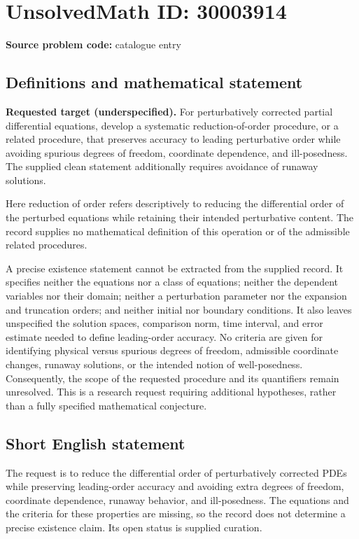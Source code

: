 \documentclass[11pt]{article}
\begin{document}
\section*{UnsolvedMath ID: 30003914}
\textbf{Source problem code:} catalogue entry
\subsection{Definitions and mathematical statement}
\textbf{Requested target (underspecified).} For perturbatively corrected partial differential equations, develop a systematic reduction-of-order procedure, or a related procedure, that preserves accuracy to leading perturbative order while avoiding spurious degrees of freedom, coordinate dependence, and ill-posedness. The supplied clean statement additionally requires avoidance of runaway solutions.

Here reduction of order refers descriptively to reducing the differential order of the perturbed equations while retaining their intended perturbative content. The record supplies no mathematical definition of this operation or of the admissible related procedures.

A precise existence statement cannot be extracted from the supplied record. It specifies neither the equations nor a class of equations; neither the dependent variables nor their domain; neither a perturbation parameter nor the expansion and truncation orders; and neither initial nor boundary conditions. It also leaves unspecified the solution spaces, comparison norm, time interval, and error estimate needed to define leading-order accuracy. No criteria are given for identifying physical versus spurious degrees of freedom, admissible coordinate changes, runaway solutions, or the intended notion of well-posedness. Consequently, the scope of the requested procedure and its quantifiers remain unresolved. This is a research request requiring additional hypotheses, rather than a fully specified mathematical conjecture.
\subsection{Short English statement}
The request is to reduce the differential order of perturbatively corrected PDEs while preserving leading-order accuracy and avoiding extra degrees of freedom, coordinate dependence, runaway behavior, and ill-posedness. The equations and the criteria for these properties are missing, so the record does not determine a precise existence claim. Its open status is supplied curation.
\end{document}
